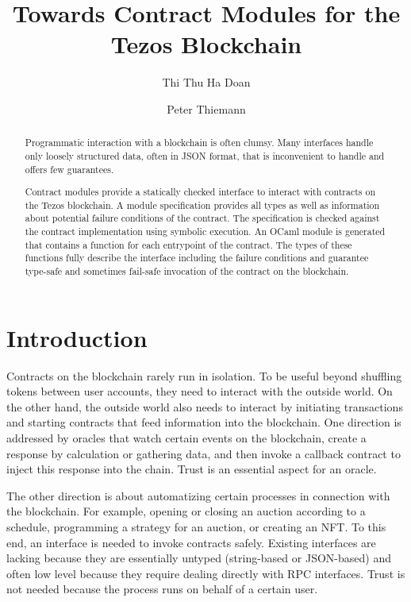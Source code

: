 \documentclass[a4paper,USenglish,american,cleveref, autoref, thm-restate]{oasics-v2021}
\title{Towards Contract Modules for the Tezos Blockchain} %
\author{Thi Thu Ha Doan}{University of Freiburg,
  Germany}{doanha@cs.uni-freiburg.de}{https://orcid.org/0000-0002-1825-0097}{supported
by a grant from the Tezos foundation}%
\author{Peter Thiemann}{University of Freiburg, Germany}{thiemann@acm.org}{https://orcid.org/0000-0002-9000-1239}{}
\begin{document}
\maketitle

\begin{abstract}
  Programmatic interaction with a blockchain is often clumsy.
  Many interfaces handle only loosely structured data, often in JSON
  format, that is inconvenient to handle and offers few guarantees.

  Contract modules provide a statically checked interface to interact
  with contracts on the Tezos blockchain. A module specification
  provides all types as well as information about potential failure
  conditions of the contract. The specification is checked against the
  contract implementation using symbolic execution. An OCaml module is
  generated that contains a function for each entrypoint of the
  contract. The types of these functions fully describe the interface
  including the failure conditions and guarantee type-safe and
  sometimes fail-safe invocation of the contract on the blockchain.
\end{abstract}

\section{Introduction}
\label{sec:introduction}

Contracts on the blockchain rarely run in isolation. To be useful
beyond shuffling tokens between user accounts, they need to interact
with the outside world. On the other hand, the outside world also
needs to interact by initiating transactions and starting contracts
that feed information into the blockchain. One direction is addressed
by oracles that watch certain events on the blockchain, create a
response by calculation or gathering data, and then invoke a callback
contract to inject this response into the chain. Trust is an essential
aspect for an oracle.

The other direction is about automatizing certain processes in
connection with the blockchain. For example, opening or closing an
auction according to a schedule, programming a strategy for an
auction, or creating an NFT. To this end, an interface is needed to
invoke contracts safely. Existing interfaces are lacking because they
are essentially untyped (string-based or JSON-based) and often low
level because they require dealing directly with RPC interfaces. Trust
is not needed because the process runs on behalf of a certain user.
\end{document}
